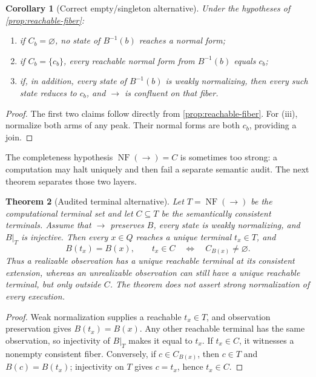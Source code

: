 \documentclass[11pt]{article}
\newtheorem{theorem}{Theorem}[section]
\newtheorem{corollary}[theorem]{Corollary}
\theoremstyle{definition}
\theoremstyle{remark}
\numberwithin{equation}{section}
\newcommand{\NF}{\operatorname{NF}}
\begin{document}
\begin{corollary}[Correct empty/singleton alternative]\label{cor:empty-singleton}
Under the hypotheses of \cref{prop:reachable-fiber}:
\begin{enumerate}[label=(\roman*)]
\item if $C_b=\varnothing$, no state of $B^{-1}(b)$ reaches a normal form;
\item if $C_b=\{c_b\}$, every reachable normal form from $B^{-1}(b)$ equals $c_b$;
\item if, in addition, every state of $B^{-1}(b)$ is weakly normalizing, then every such state reduces to $c_b$, and $\to$ is confluent on that fiber.
\end{enumerate}
\end{corollary}

\begin{proof}
The first two claims follow directly from \cref{prop:reachable-fiber}.  For (iii), normalize both arms of any peak.  Their normal forms are both $c_b$, providing a join.
\end{proof}

The completeness hypothesis $\NF(\to)=C$ is sometimes too strong: a
computation may halt uniquely and then fail a separate semantic audit.  The
next theorem separates those two layers.

\begin{theorem}[Audited terminal alternative]\label{thm:audited-terminal}
Let $T=\NF(\to)$ be the computational terminal set and let $C\subseteq T$
be the semantically consistent terminals.  Assume that $\to$ preserves $B$,
every state is weakly normalizing, and $B|_T$ is injective.  Then every
$x\in Q$ reaches a unique terminal $t_x\in T$, and
\[
 B(t_x)=B(x),
 \qquad
 t_x\in C
 \quad\Longleftrightarrow\quad
 C_{B(x)}\ne\varnothing.
\]
Thus a realizable observation has a unique reachable terminal at its
consistent extension, whereas an unrealizable observation can still have a
unique reachable terminal, but only outside $C$.  The theorem does not assert
strong normalization of every execution.
\end{theorem}

\begin{proof}
Weak normalization supplies a reachable $t_x\in T$, and observation
preservation gives $B(t_x)=B(x)$.  Any other reachable terminal has the same
observation, so injectivity of $B|_T$ makes it equal to $t_x$.  If
$t_x\in C$, it witnesses a nonempty consistent fiber.  Conversely, if
$c\in C_{B(x)}$, then $c\in T$ and $B(c)=B(t_x)$; injectivity on $T$ gives
$c=t_x$, hence $t_x\in C$.
\end{proof}
\end{document}
